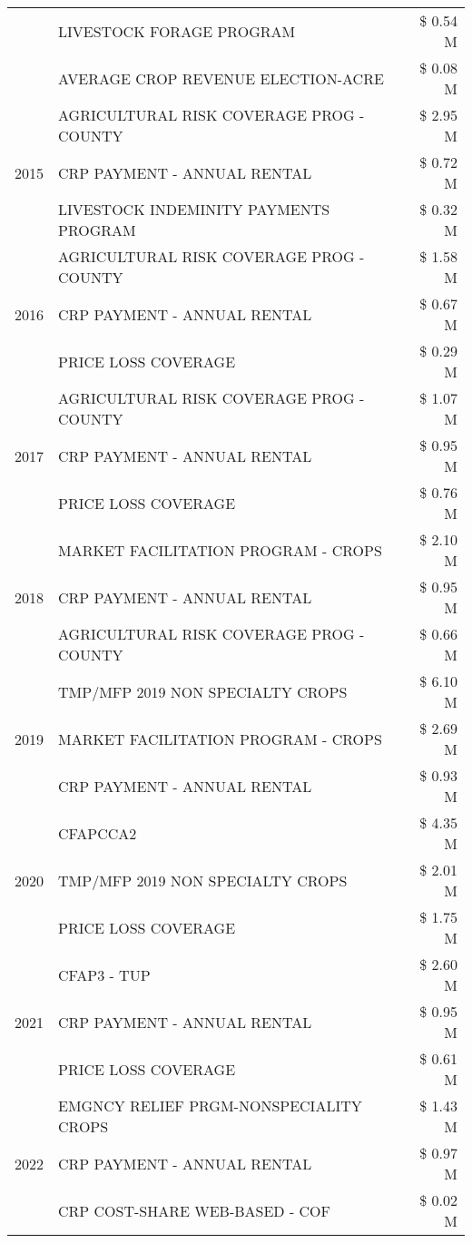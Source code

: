 \begin{tabular}{llr}
 & LIVESTOCK FORAGE PROGRAM & \$ 0.54 M \\
 & AVERAGE CROP REVENUE ELECTION-ACRE & \$ 0.08 M \\
\cline{1-3}
\multirow[t]{3}{*}{2015} & AGRICULTURAL RISK COVERAGE PROG - COUNTY & \$ 2.95 M \\
 & CRP PAYMENT - ANNUAL RENTAL & \$ 0.72 M \\
 & LIVESTOCK INDEMINITY PAYMENTS PROGRAM & \$ 0.32 M \\
\cline{1-3}
\multirow[t]{3}{*}{2016} & AGRICULTURAL RISK COVERAGE PROG - COUNTY & \$ 1.58 M \\
 & CRP PAYMENT - ANNUAL RENTAL & \$ 0.67 M \\
 & PRICE LOSS COVERAGE & \$ 0.29 M \\
\cline{1-3}
\multirow[t]{3}{*}{2017} & AGRICULTURAL RISK COVERAGE PROG - COUNTY & \$ 1.07 M \\
 & CRP PAYMENT - ANNUAL RENTAL & \$ 0.95 M \\
 & PRICE LOSS COVERAGE & \$ 0.76 M \\
\cline{1-3}
\multirow[t]{3}{*}{2018} & MARKET FACILITATION PROGRAM - CROPS & \$ 2.10 M \\
 & CRP PAYMENT - ANNUAL RENTAL & \$ 0.95 M \\
 & AGRICULTURAL RISK COVERAGE PROG - COUNTY & \$ 0.66 M \\
\cline{1-3}
\multirow[t]{3}{*}{2019} & TMP/MFP 2019 NON SPECIALTY CROPS & \$ 6.10 M \\
 & MARKET FACILITATION PROGRAM - CROPS & \$ 2.69 M \\
 & CRP PAYMENT - ANNUAL RENTAL & \$ 0.93 M \\
\cline{1-3}
\multirow[t]{3}{*}{2020} & CFAPCCA2 & \$ 4.35 M \\
 & TMP/MFP 2019 NON SPECIALTY CROPS & \$ 2.01 M \\
 & PRICE LOSS COVERAGE & \$ 1.75 M \\
\cline{1-3}
\multirow[t]{3}{*}{2021} & CFAP3 - TUP & \$ 2.60 M \\
 & CRP PAYMENT - ANNUAL RENTAL & \$ 0.95 M \\
 & PRICE LOSS COVERAGE & \$ 0.61 M \\
\cline{1-3}
\multirow[t]{3}{*}{2022} & EMGNCY RELIEF PRGM-NONSPECIALITY CROPS & \$ 1.43 M \\
 & CRP PAYMENT - ANNUAL RENTAL & \$ 0.97 M \\
 & CRP COST-SHARE WEB-BASED - COF & \$ 0.02 M \\
\cline{1-3}
\bottomrule
\end{tabular}
